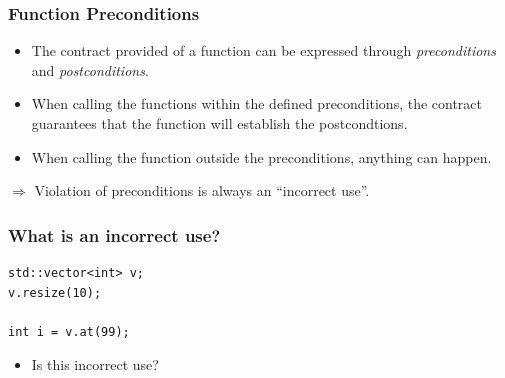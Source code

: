\documentclass[aspectratio=169]{beamer}
\newif\iftransitions
\newcommand{\cpause}{\iftransitions \pause \fi}
\begin{document}
\begin{frame}
  \frametitle{Function Preconditions}
  
  \begin{itemize}
    \item The contract provided of a function can be expressed through \textit{preconditions} and \textit{postconditions}. \cpause
    \item When calling the functions within the defined preconditions, the contract guarantees that the function will establish the postcondtions.  \cpause
    \item When calling the function outside the preconditions, anything can happen. \cpause
  \end{itemize}
  
  \vspace{20pt}
  
  $\Rightarrow$ Violation of preconditions is always an ``incorrect use''.
\end{frame}

\begin{frame}[fragile]
  \frametitle{What is an incorrect use?}
  
  \begin{lstlisting}[style=cpp20]
std::vector<int> v;
v.resize(10);

int i = v.at(99);
  \end{lstlisting}
  
  \vspace{20pt}
  
  \begin{itemize}
    \item Is this incorrect use?
  \end{itemize}
  
\end{frame}
\end{document}
